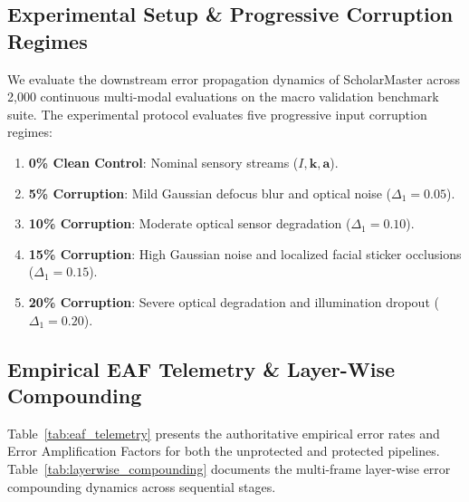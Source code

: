 \documentclass[conference]{IEEEtran}
\begin{document}
\subsection{Experimental Setup \& Progressive Corruption Regimes}
We evaluate the downstream error propagation dynamics of ScholarMaster across 2,000 continuous multi-modal evaluations on the macro validation benchmark suite. The experimental protocol evaluates five progressive input corruption regimes:
\begin{enumerate}
    \item \textbf{0\% Clean Control}: Nominal sensory streams ($I, \mathbf{k}, \mathbf{a}$).
    \item \textbf{5\% Corruption}: Mild Gaussian defocus blur and optical noise ($\Delta_1 = 0.05$).
    \item \textbf{10\% Corruption}: Moderate optical sensor degradation ($\Delta_1 = 0.10$).
    \item \textbf{15\% Corruption}: High Gaussian noise and localized facial sticker occlusions ($\Delta_1 = 0.15$).
    \item \textbf{20\% Corruption}: Severe optical degradation and illumination dropout ($\Delta_1 = 0.20$).
\end{enumerate}

\subsection{Empirical EAF Telemetry \& Layer-Wise Compounding}
Table~\ref{tab:eaf_telemetry} presents the authoritative empirical error rates and Error Amplification Factors for both the unprotected and protected pipelines. Table~\ref{tab:layerwise_compounding} documents the multi-frame layer-wise error compounding dynamics across sequential stages.

\begin{table}[t]
\centering
\caption{Downstream Error Propagation and EAF Telemetry Across Corruption Regimes}
\label{tab:eaf_telemetry}
\end{table}
\end{document}

